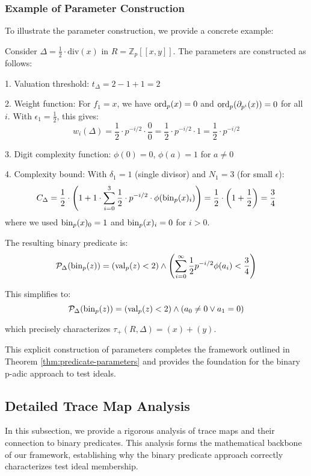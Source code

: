 \subsubsection{Example of Parameter Construction}

To illustrate the parameter construction, we provide a concrete example:

\begin{example}\label{ex:param-construction}
Consider $\Delta = \frac{1}{2} \cdot \text{div}(x)$ in $R = \mathbb{Z}_p[[x,y]]$. The parameters are constructed as follows:

1. Valuation threshold: $t_\Delta = 2 - 1 + 1 = 2$

2. Weight function: For $f_1 = x$, we have $\operatorname{ord}_p(x) = 0$ and $\operatorname{ord}_p(\partial_{p^i}(x)) = 0$ for all $i$. With $\epsilon_1 = \frac{1}{2}$, this gives:
$$w_i(\Delta) = \frac{1}{2} \cdot p^{-i/2} \cdot \frac{0}{0} = \frac{1}{2} \cdot p^{-i/2} \cdot 1 = \frac{1}{2} \cdot p^{-i/2}$$

3. Digit complexity function: $\phi(0) = 0$, $\phi(a) = 1$ for $a \neq 0$

4. Complexity bound: With $\delta_1 = 1$ (single divisor) and $N_1 = 3$ (for small $\epsilon$):
$$C_\Delta = \frac{1}{2} \cdot \left(1 + 1 \cdot \sum_{i=0}^{3} \frac{1}{2} \cdot p^{-i/2} \cdot \phi(\operatorname{bin}_p(x)_i) \right) = \frac{1}{2} \cdot \left(1 + \frac{1}{2} \right) = \frac{3}{4}$$
where we used $\operatorname{bin}_p(x)_0 = 1$ and $\operatorname{bin}_p(x)_i = 0$ for $i > 0$.

The resulting binary predicate is:
$$\mathcal{P}_\Delta(\operatorname{bin}_p(z)) = (\operatorname{val}_p(z) < 2) \wedge \left(\sum_{i=0}^{\infty} \frac{1}{2} p^{-i/2} \phi(a_i) < \frac{3}{4}\right)$$

This simplifies to:
$$\mathcal{P}_\Delta(\operatorname{bin}_p(z)) = (\operatorname{val}_p(z) < 2) \wedge (a_0 \neq 0 \vee a_1 = 0)$$

which precisely characterizes $\tau_+(R,\Delta) = (x) + (y)$.
\end{example}

This explicit construction of parameters completes the framework outlined in Theorem \ref{thm:predicate-parameters} and provides the foundation for the binary p-adic approach to test ideals.

\subsection{Detailed Trace Map Analysis}

In this subsection, we provide a rigorous analysis of trace maps and their connection to binary predicates. This analysis forms the mathematical backbone of our framework, establishing why the binary predicate approach correctly characterizes test ideal membership.

